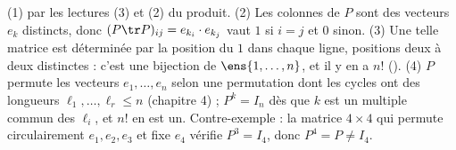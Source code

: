 \begin{preuve}
(1) par les lectures (3) et (2) du produit. (2) Les colonnes de $P$ sont des vecteurs $e_k$ distincts, donc $(P\tr P)_{ij}=e_{k_i}\cdot e_{k_j}$ vaut $1$ si $i=j$ et $0$ sinon. (3) Une telle matrice est déterminée par la position du $1$ dans chaque ligne, positions deux à deux distinctes : c'est une bijection de $\ens{1,\dots,n}$, et il y en a $n!$ (). (4) $P$ permute les vecteurs $e_1,\dots,e_n$ selon une permutation dont les cycles ont des longueurs $\ell_1,\dots,\ell_r\le n$ (chapitre 4) ; $P^k=I_n$ dès que $k$ est un multiple commun des $\ell_i$, et $n!$ en est un. Contre-exemple : la matrice $4\times4$ qui permute circulairement $e_1,e_2,e_3$ et fixe $e_4$ vérifie $P^3=I_4$, donc $P^4=P\neq I_4$.
\end{preuve}

